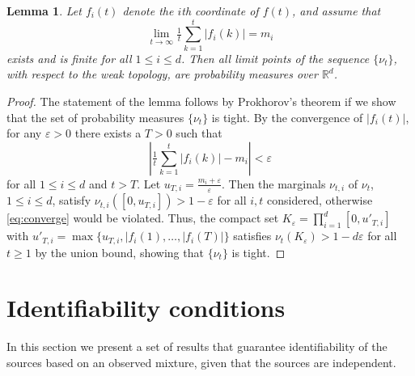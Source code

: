 \documentclass[english]{article} %
\newcommand{\real}{\mathbb{R}}
\newcounter{assumption}%
\newtheorem{lemma}{Lemma}[section]
\theoremstyle{definition}
\newcommand{\eps}{\varepsilon}
\begin{document}
\begin{lemma}
\label{lem:ergodicfunction}
Let $f_i(t)$ denote the $i$th coordinate of $f(t)$, and assume that
\begin{equation}
\label{eq:ergodicproperty}
\lim_{t\to\infty} \tfrac{1}{t}\sum_{k=1}^t |f_i(k)|=m_i
\end{equation}
exists and is finite for all $1 \le i \le d$.
Then all limit points of the sequence $\{\nu_t\}$, with respect to the weak topology, are probability measures over $\real^d$.
\end{lemma}
\begin{proof}
The statement of the lemma follows by Prokhorov's theorem if we show that the set of probability measures $\{\nu_t\}$ is tight.
By the convergence of $|f_i(t)|$, for any $\eps>0$ there exists a $T>0$ such that
\begin{equation}
\label{eq:converge}
\left| \tfrac{1}{t} \sum_{k=1}^t |f_i(k)| - m_i \right| <\eps
\end{equation}
for all $1 \le i \le d$ and $t>T$. Let $u_{T,i}=\tfrac{m_i+\eps}{\eps}$. Then the marginals
$\nu_{t,i}$ of $\nu_t$, $1\le i \le d$, satisfy $\nu_{t,i}([0,u_{T,i}]) > 1-\eps$ for all $i,t$ considered, otherwise \eqref{eq:converge} would be violated. Thus, the compact set
$K_{\eps}=\prod_{i=1}^d [0,u'_{T,i}]$ with $u'_{T,i}=\max\{u_{T,i},|f_i(1),\ldots,|f_i(T)|\}$ satisfies
$\nu_t(K_{\eps})>1-d \eps$ for all $t \ge 1$ by the union bound, showing that $\{\nu_t\}$ is tight.
\end{proof}
\fi


\section{Identifiability conditions}
In this section we present a set of results that guarantee identifiability of the sources
based on an observed mixture, given that the sources are independent.
\end{document}
